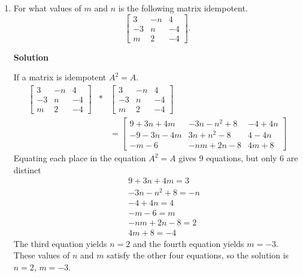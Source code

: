 \begin{enumerate}
\item For what values of $m$ and $n$ is the following matrix
idempotent.$$\left [ \begin{array}{rrr} 3&-n&4\\
-3&n&-4\\m&2&-4
\end{array} \right ].$$

\noindent \textbf{Solution}

\noindent If a matrix is idempotent $A^{2}=A$.
\begin{eqnarray*}
\left[ \begin{array}{rrr}
                           3&-n&4\\ -3&n&-4\\m&2&-4 \end{array} \right]
 &*& \left[ \begin{array}{rrr}
                           3&-n&4\\ -3&n&-4\\m&2&-4 \end{array} \right]
 \\&&=
 \left[ \begin{array}{rrr}
                           9+3n+4m&-3n-n^2+8&-4+4n\\
                           -9-3n-4m&3n+n^2-8&4-4n\\
                           -m-6&-nm+2n-8&4m+8 \end{array} \right]
\end{eqnarray*}
\noindent Equating each place in the equation $A^{2}=A$ gives 9 equations,
but only 6 are distinct
\begin{eqnarray*}
&&9+3n+4m=3\\
&&-3n-n^{2}+8=-n\\
&&-4+4n=4\\
&&-m-6=m\\
&&-nm+2n-8=2\\
&&4m+8=-4
\end{eqnarray*}
\noindent The third equation yields $n=2$ and the fourth equation
yields $m=-3$. These values of $n$ and $m$ satisfy the other four
equations, so the solution is $n=2$, $m=-3$.
\end{enumerate}
\newpage
\markboth{}{}
